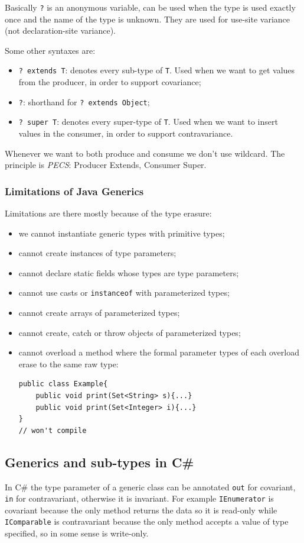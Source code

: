 Basically \verb|?| is an anonymous variable, can be used when the type is used exactly once and the name of the type is unknown.
They are used for use-site variance (not declaration-site variance).

Some other syntaxes are:
\begin{itemize}
    \item \verb|? extends T|: denotes every sub-type of \verb|T|.
    Used when we want to get values from the producer, in order to support covariance;

    \item \verb|?|: shorthand for \verb|? extends Object|;

    \item \verb|? super T|: denotes every super-type of \verb|T|.
    Used when we want to insert values in the consumer, in order to support contravariance.
\end{itemize}
Whenever we want to both produce and consume we don't use wildcard.
The principle is \emph{PECS}: Producer Extends, Consumer Super.

\subsubsection{Limitations of Java Generics}
Limitations are there mostly because of the type erasure:
\begin{itemize}
    \item we cannot instantiate generic types with primitive types;
    \item cannot create instances of type parameters;
    \item cannot declare static fields whose types are type parameters;
    \item cannot use casts or \verb|instanceof| with parameterized types;
    \item cannot create arrays of parameterized types;
    \item cannot create, catch or throw objects of parameterized types;
    \item cannot overload a method where the formal parameter types of each overload erase to the same raw type:
\begin{verbatim}
public class Example{
    public void print(Set<String> s){...}
    public void print(Set<Integer> i){...}
}
// won't compile
\end{verbatim}
\end{itemize}


\subsection{Generics and sub-types in C\#}
In C\# the type parameter of a generic class can be annotated \verb|out| for covariant, \verb|in| for contravariant, otherwise it is invariant.
For example \verb|IEnumerator| is covariant because the only method returns the data so it is read-only while \verb|IComparable| is contravariant because the only method accepts a value of type specified, so in some sense is write-only.


